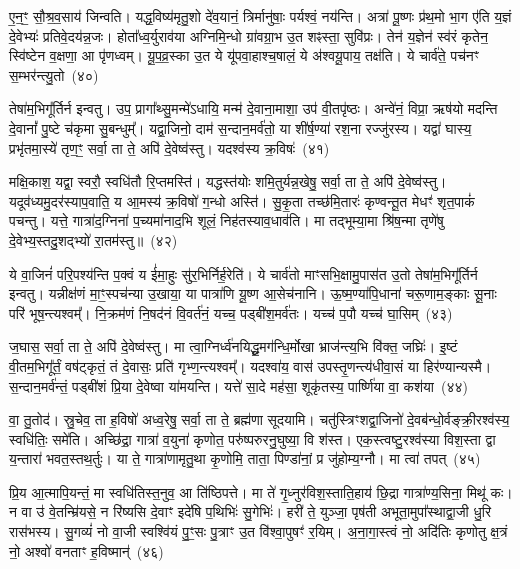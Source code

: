 ए॒न॒ꣳ॒ सौ॒श्र॒व॒साय॑ जिन्वति। यद्ध॒विष्य॑मृतु॒शो दे॑व॒यानं॒ त्रिर्मानु॑षाः॒ पर्यश्वं॒ नय॑न्ति। अत्रा॑ पू॒ष्णः प्र॑थ॒मो भा॒ग ए॑ति य॒ज्ञं दे॒वेभ्यः॑ प्रतिवे॒दय॑न्न॒जः। होता᳚ध्व॒र्युराव॑या अग्निमि॒न्धो ग्रा॑वग्रा॒भ उ॒त शꣴस्ता॒ सुवि॑प्रः। तेन॑ य॒ज्ञेन॑ स्व॑रं कृतेन॒ स्वि॑ष्टेन व॒क्षणा॒ आ पृ॑णध्वम्। यू॒प॒व्र॒स्का उ॒त ये यू॑पवा॒हाश्च॒षालं॒ ये अ॑श्वयू॒पाय॒ तक्ष॑ति। ये चार्व॑ते॒ पच॑नꣳ स॒म्भर॑न्त्यु॒तो~(४०)

तेषा॑म॒भिगू᳚र्तिर्न इन्वतु। उप॒ प्रागा᳚थ्सु॒मन्मे॑\-ऽधायि॒ मन्म॑ दे॒वाना॒माशा॒ उप॑ वी॒तपृ॑ष्ठः। अन्वे॑नं॒ विप्रा॒ ऋष॑यो मदन्ति दे॒वानां᳚ पु॒ष्टे च॑कृमा सु॒बन्धुम्᳚। यद्वा॒जिनो॒ दाम॑ स॒न्दान॒मर्व॑तो॒ या शी॑र्\mbox{}ष॒ण्या॑ रश॒ना रज्जु॑रस्य। यद्वा॑ घास्य॒ प्रभृ॑तमा॒स्ये॑ तृण॒ꣳ॒ सर्वा॒ ता ते॒ अपि॑ दे॒वेष्व॑स्तु। यदश्व॑स्य क्र॒विषः॑~(४१)

मक्षि॒काश॒ यद्वा॒ स्वरौ॒ स्वधि॑तौ रि॒प्तमस्ति॑। यद्धस्त॑योः शमि॒तुर्यन्न॒खेषु॒ सर्वा॒ ता ते॒ अपि॑ दे॒वेष्व॑स्तु। यदूव॑ध्यमु॒दर॑स्याप॒वाति॒ य आ॒मस्य॑ क्र॒विषो॑ ग॒न्धो अस्ति॑। सु॒कृ॒ता तच्छ॑मि॒तारः॑ कृण्वन्तू॒त मेधꣳ॑ शृत॒पाकं॑ पचन्तु। यत्ते॒ गात्रा॑द॒ग्निना॑ प॒च्यमा॑नाद॒भि शूलं॒ निह॑तस्याव॒धाव॑ति। मा तद्भूम्या॒मा श्रि॑ष॒न्मा तृणे॑षु दे॒वेभ्य॒स्तदु॒शद्भ्यो॑ रा॒तम॑स्तु॥~(४२)

{\anuvakamend[{इदु॒तो क्र॒विषः॑ श्रिषथ्स॒प्त च॑}]}%

ये वा॒जिनं॑ परि॒पश्य॑न्ति प॒क्वं य ई॑मा॒हुः सु॑र॒भिर्निर्\mbox{}ह॒रेति॑। ये चार्व॑तो माꣳसभि॒क्षामु॒पास॑त उ॒तो तेषा॑म॒भिगू᳚र्तिर्न इन्वतु। यन्नीक्ष॑णं मा॒ꣳ॒स्पच॑न्या उ॒खाया॒ या पात्रा॑णि यू॒ष्ण आ॒सेच॑नानि। ऊ॒ष्म॒ण्या॑पि॒धाना॑ चरू॒णाम॒ङ्काः सू॒नाः परि॑ भूष॒न्त्यश्वम्᳚। नि॒क्रम॑णं नि॒षद॑नं वि॒वर्त॑नं॒ यच्च॒ पड्बी॑श॒मर्व॑तः। यच्च॑ प॒पौ यच्च॑ घा॒सिम्~(४३)

ज॒घास॒ सर्वा॒ ता ते॒ अपि॑ दे॒वेष्व॑स्तु। मा त्वा॒ग्निर्ध्व॑नयिद्धू॒मग॑न्धि॒र्मोखा भ्राज॑न्त्य॒भि वि॑क्त॒ जघ्रिः॑। इ॒ष्टं वी॒तम॒भिगू᳚र्तं॒ वष॑ट्कृतं॒ तं दे॒वासः॒ प्रति॑ गृभ्ण॒न्त्यश्वम्᳚। यदश्वा॑य॒ वास॑ उपस्तृ॒णन्त्य॑धीवा॒सं या हिर॑ण्यान्यस्मै। स॒न्दान॒मर्व॑न्तं॒ पड्बी॑शं प्रि॒या दे॒वेष्वा या॑मयन्ति। यत्ते॑ सा॒दे मह॑सा॒ शूकृ॑तस्य॒ पार्ष्णि॑या वा॒ कश॑या~(४४)

वा॒ तु॒तोद॑। स्रु॒चेव॒ ता ह॒विषो॑ अध्व॒रेषु॒ सर्वा॒ ता ते॒ ब्रह्म॑णा सूदयामि। चतु॑स्त्रिꣳशद्वा॒जिनो॑ दे॒वब॑न्धो॒र्वङ्क्री॒रश्व॑स्य॒ स्वधि॑तिः॒ समे॑ति। अच्छि॑द्रा॒ गात्रा॑ व॒युना॑ कृणोत॒ परु॑ष्परुरनु॒घुष्या॒ वि श॑स्त। एक॒स्त्वष्टु॒रश्व॑स्या विश॒स्ता द्वा य॒न्तारा॑ भवत॒स्तथ॒र्तुः। या ते॒ गात्रा॑णामृतु॒था कृ॒णोमि॒ ताता॒ पिण्डा॑नां॒ प्र जु॑होम्य॒ग्नौ। मा त्वा॑ तपत्~(४५)

प्रि॒य आ॒त्मापि॒यन्तं॒ मा स्वधि॑तिस्त॒नुव॒ आ ति॑ष्ठिपत्ते। मा ते॑ गृ॒ध्नुर॑विश॒स्ताति॒हाय॑ छि॒द्रा गात्रा॑ण्य॒सिना॒ मिथू॑ कः। न वा उ॑ वे॒तन्म्रि॑यसे॒ न रि॑ष्यसि दे॒वाꣳ इदे॑षि प॒थिभिः॑ सु॒गेभिः॑। हरी॑ ते॒ युञ्जा॒ पृष॑ती अभूता॒मुपा᳚स्थाद्वा॒जी धु॒रि रास॑भस्य। सु॒गव्यं॑ नो वा॒जी स्वश्वि॑यं पु॒ꣳ॒सः पु॒त्राꣳ उ॒त वि॑श्वा॒पुषꣳ॑ र॒यिम्। अ॒ना॒गा॒स्त्वं नो॒ अदि॑तिः कृणोतु क्ष॒त्रं नो॒ अश्वो॑ वनताꣳ ह॒विष्मान्॑~(४६)


